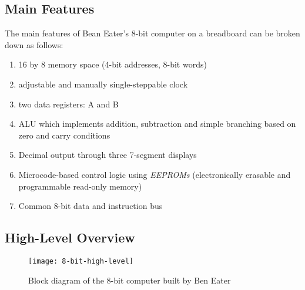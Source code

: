 \subsection{Main Features}
The main features of Bean Eater's 8-bit computer on a breadboard can be broken down as follows:
\begin{enumerate}
  \item 16 by 8 memory space (4-bit addresses, 8-bit words)
  \item adjustable and manually single-steppable clock
  \item two data registers: A and B
  \item ALU which implements addition, subtraction and simple branching based on zero and carry conditions
  \item Decimal output through three 7-segment displays
  \item Microcode-based control logic using \emph{EEPROMs} (electronically erasable and programmable read-only memory)
  \item Common 8-bit data and instruction bus
\end{enumerate}

\subsection{High-Level Overview}
\begin{figure}[ht]
  \centering
  \texttt{[image: 8-bit-high-level]}
  \caption{Block diagram of the 8-bit computer built by Ben Eater \cite{eater2019highlevel}}
  \label{8-bit-high-level}
\end{figure}



